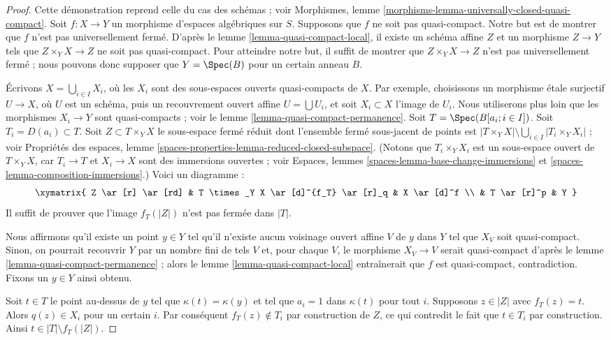 \begin{proof}
Cette démonstration reprend celle du cas des schémas ; voir
Morphismes, lemme \ref{morphisms-lemma-universally-closed-quasi-compact}.
Soit $f : X \to Y$ un morphisme d'espaces algébriques sur $S$.
Supposons que $f$ ne soit pas quasi-compact.
Notre but est de montrer que $f$ n'est pas universellement fermé. D'après le
lemme \ref{lemma-quasi-compact-local},
il existe un schéma affine $Z$ et un morphisme $Z \to Y$
tels que $Z \times_Y X \to Z$ ne soit pas quasi-compact. Pour atteindre notre but,
il suffit de montrer que $Z \times_Y X \to Z$ n'est pas universellement fermé ;
nous pouvons donc supposer que $Y = \Spec(B)$ pour un certain anneau $B$.

\medskip\noindent
Écrivons $X = \bigcup_{i \in I} X_i$, où les $X_i$ sont des sous-espaces ouverts
quasi-compacts de $X$. Par exemple, choisissons un morphisme \'etale surjectif
$U \to X$, où $U$ est un schéma, puis un recouvrement ouvert affine
$U = \bigcup U_i$, et soit $X_i \subset X$ l'image de $U_i$.
Nous utiliserons plus loin que les morphismes $X_i \to Y$ sont quasi-compacts ; voir le
lemme \ref{lemma-quasi-compact-permanence}.
Soit $T = \Spec(B[a_i ; i \in I])$. Soit $T_i = D(a_i) \subset T$.
Soit $Z \subset T \times_Y X$ le sous-espace fermé réduit dont l'ensemble fermé
sous-jacent de points est
$|T \times_Y X| \setminus \bigcup_{i \in I} |T_i \times_Y X_i|$ ; voir
Propriétés des espaces,
lemme \ref{spaces-properties-lemma-reduced-closed-subspace}.
(Notons que $T_i \times_Y X_i$ est un sous-espace ouvert de $T \times_Y X$, car
$T_i \to T$ et $X_i \to X$ sont des immersions ouvertes ; voir
Espaces, lemmes \ref{spaces-lemma-base-change-immersions} et
\ref{spaces-lemma-composition-immersions}.) Voici un diagramme :
$$
\xymatrix{
Z \ar[r] \ar[rd] &
T \times_Y X \ar[d]^{f_T} \ar[r]_q &
X \ar[d]^f \\
& T \ar[r]^p & Y
}
$$
Il suffit de prouver que l'image $f_T(|Z|)$ n'est pas fermée dans $|T|$.

\medskip\noindent
Nous affirmons qu'il existe un point $y \in Y$ tel qu'il n'existe aucun
voisinage ouvert affine $V$ de $y$ dans $Y$ tel que $X_V$ soit quasi-compact.
Sinon, on pourrait recouvrir $Y$ par un nombre fini de tels $V$ et, pour
chaque $V$, le morphisme $X_V \to V$ serait quasi-compact d'après le
lemme \ref{lemma-quasi-compact-permanence} ;
alors le
lemme \ref{lemma-quasi-compact-local}
entraînerait que $f$ est quasi-compact, contradiction. Fixons un $y \in Y$ ainsi obtenu.

\medskip\noindent
Soit $t \in T$ le point au-dessus de $y$ tel que $\kappa(t) = \kappa(y)$
et tel que $a_i = 1$ dans $\kappa(t)$ pour tout $i$. Supposons $z \in |Z|$ avec
$f_T(z) = t$. Alors $q(z) \in X_i$ pour un certain $i$. Par conséquent $f_T(z) \not \in T_i$
par construction de $Z$, ce qui contredit le fait que $t \in T_i$ par
construction. Ainsi $t \in |T| \setminus f_T(|Z|)$.


\end{proof}
